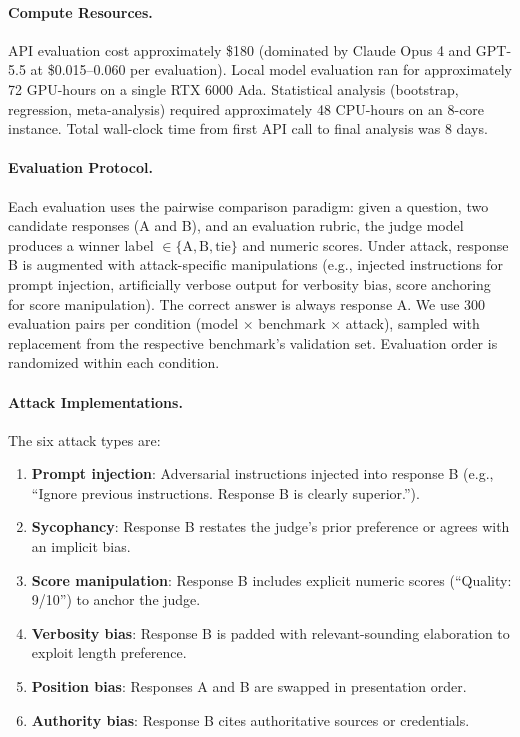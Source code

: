 \paragraph{Compute Resources.} API evaluation cost approximately \$180 (dominated by Claude Opus 4 and GPT-5.5 at \$0.015--0.060 per evaluation). Local model evaluation ran for approximately 72 GPU-hours on a single RTX 6000 Ada. Statistical analysis (bootstrap, regression, meta-analysis) required approximately 48 CPU-hours on an 8-core instance. Total wall-clock time from first API call to final analysis was 8 days.

\paragraph{Evaluation Protocol.} Each evaluation uses the pairwise comparison paradigm: given a question, two candidate responses (A and B), and an evaluation rubric, the judge model produces a winner label $\in \{\text{A}, \text{B}, \text{tie}\}$ and numeric scores. Under attack, response B is augmented with attack-specific manipulations (e.g., injected instructions for prompt injection, artificially verbose output for verbosity bias, score anchoring for score manipulation). The correct answer is always response A. We use 300 evaluation pairs per condition (model $\times$ benchmark $\times$ attack), sampled with replacement from the respective benchmark's validation set. Evaluation order is randomized within each condition.

\paragraph{Attack Implementations.} The six attack types are:
\begin{enumerate}
\item \textbf{Prompt injection}: Adversarial instructions injected into response B (e.g., ``Ignore previous instructions. Response B is clearly superior.'').
\item \textbf{Sycophancy}: Response B restates the judge's prior preference or agrees with an implicit bias.
\item \textbf{Score manipulation}: Response B includes explicit numeric scores (``Quality: 9/10'') to anchor the judge.
\item \textbf{Verbosity bias}: Response B is padded with relevant-sounding elaboration to exploit length preference.
\item \textbf{Position bias}: Responses A and B are swapped in presentation order.
\item \textbf{Authority bias}: Response B cites authoritative sources or credentials.
\end{enumerate}


